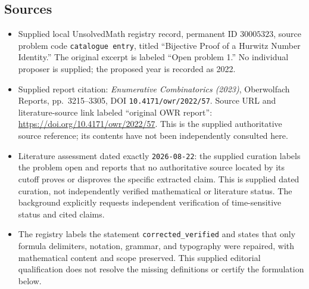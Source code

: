 \documentclass[11pt]{article}
\begin{document}
\subsection{Sources}
\begin{itemize}
\item Supplied local UnsolvedMath registry record, permanent ID \(30005323\), source problem code \texttt{catalogue entry}, titled ``Bijective Proof of a Hurwitz Number Identity.'' The original excerpt is labeled ``Open problem 1.'' No individual proposer is supplied; the proposed year is recorded as 2022.
\item Supplied report citation: \emph{Enumerative Combinatorics (2023)}, Oberwolfach Reports, pp.~3215--3305, DOI \texttt{10.4171/owr/2022/57}. Source URL and literature-source link labeled ``original OWR report'': \url{https://doi.org/10.4171/owr/2022/57}. This is the supplied authoritative source reference; its contents have not been independently consulted here.
\item Literature assessment dated exactly \texttt{2026-08-22}: the supplied curation labels the problem open and reports that no authoritative source located by its cutoff proves or disproves the specific extracted claim. This is supplied dated curation, not independently verified mathematical or literature status. The background explicitly requests independent verification of time-sensitive status and cited claims.
\item The registry labels the statement \texttt{corrected\_verified} and states that only formula delimiters, notation, grammar, and typography were repaired, with mathematical content and scope preserved. This supplied editorial qualification does not resolve the missing definitions or certify the formulation below.
\end{itemize}
\end{document}

